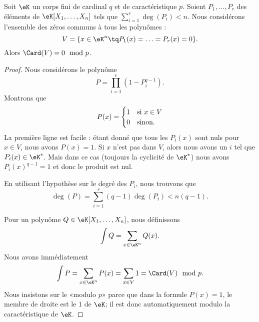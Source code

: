 \begin{theorem}        \label{ThoLTcYKk}
    Soit \( \eK\) un corps fini de cardinal \( q\) et de caractéristique \( p\). Soient \( P_1,\ldots, P_r\) des éléments de \( \eK[X_1,\ldots, X_n]\) tels que \( \sum_{i=1}^r\deg(P_i)<n\). Nous considérons l'ensemble des zéros communs à tous les polynômes :
    \begin{equation}
        V=\{ x\in \eK^n\tq P_1(x)=\ldots=P_r(x)=0 \}.
    \end{equation}
    Alors \( \Card(V)=0\mod p\).
\end{theorem}

\begin{proof}
    Nous considérons le polynôme
    \begin{equation}
        P=\prod_{i=1}^r(1-P_i^{q-1}).
    \end{equation}
    Montrons que
    \begin{equation}
        P(x)=\begin{cases}
            1    &   \text{si \( x\in V\)}\\
            0    &    \text{sinon}.
        \end{cases}
    \end{equation}
    La première ligne est facile : étant donné que tous les \( P_i(x)\) sont nuls pour \( x\in V\), nous avons \( P(x)=1\). Si \( x\) n'est pas dans \( V\), alors nous avons un \( i\) tel que \( P_i(x)\in \eK^*\). Mais dans ce cas (toujours la cyclicité de \( \eK^*\)) nous avons \( P_i(x)^{q-1}=1\) et donc le produit est nul.

    En utilisant l'hypothèse sur le degré des \( P_i\), nous trouvons que
    \begin{equation}
        \deg(P)=\sum_{i=1}^r(q-1)\deg(P_i)<n(q-1).
    \end{equation}

    Pour un polynôme \( Q\in \eK[X_1,\ldots, X_n]\), nous définissons 
    \begin{equation}
        \int Q=\sum_{x\in \eK^n}Q(x).
    \end{equation}
    Nous avons immédiatement
    \begin{equation}
        \int P=\sum_{x\in \eK^n}P(x)=\sum_{x\in V}1=\Card(V)\mod p.
    \end{equation}
    Nous insistons sur le «modulo \( p\)» parce que dans la formule \( P(x)=1\), le membre de droite est le \( 1\) de \( \eK\); il est donc automatiquement modulo la caractéristique de \( \eK\).


\end{proof}
